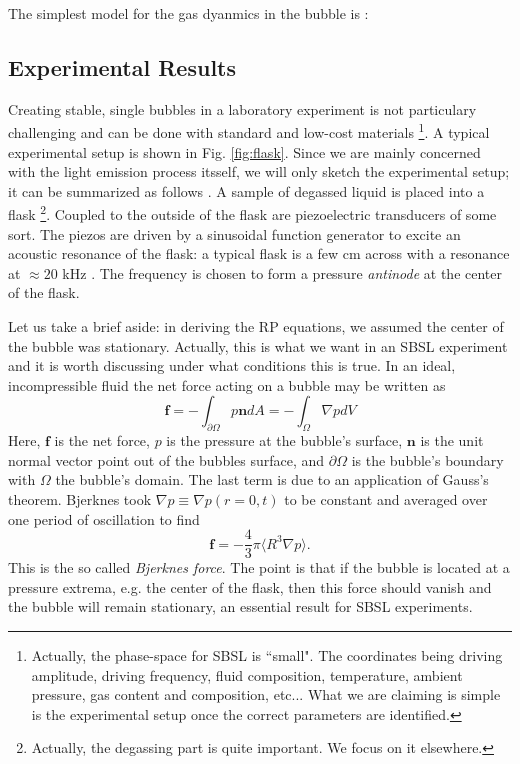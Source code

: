 \documentclass[rmp,aps,nofootinbib,superscriptaddress,floatfix,10pt]{revtex4-2}
\begin{document}
The simplest model for the gas dyanmics in the bubble is {}:



\subsection{Experimental Results}
Creating stable, single bubbles in a laboratory experiment is not particulary challenging and can be done with standard and low-cost materials \footnote{Actually, the phase-space for SBSL is ``small". The coordinates being driving amplitude, driving frequency, fluid composition, temperature, ambient pressure, gas content and composition, etc... What we are claiming is simple is the experimental setup once the correct parameters are identified.}. A typical experimental setup is shown in Fig. \ref{fig:flask}. Since we are mainly concerned with the light emission process itsself, we will only sketch the experimental setup; it can be summarized as follows \cite{lentz1995mie,gaitan1990experimental,gaitan1992sonoluminescence,gompf2000mie,brenner2002single,yasui2018acoustic,brennen2014cavitation,suslick2008inside}. A sample of degassed liquid is placed into a flask \footnote{Actually, the degassing part is quite important. We focus on it elsewhere.}. Coupled to the outside of the flask are piezoelectric transducers of some sort. The piezos are driven by a sinusoidal function generator to excite an acoustic resonance of the flask: a typical flask is a few cm across with a resonance at $\approx 20$ kHz \cite{brenner2002single}. The frequency is chosen to form a pressure \emph{antinode} at the center of the flask.

Let us take a brief aside: in deriving the RP equations, we assumed the center of the bubble was stationary. Actually, this is what we want in an SBSL experiment and it is worth discussing under what conditions this is true. In an ideal, incompressible fluid the net force acting on a bubble may be written as 
\begin{equation}
    \bm{f}=-\int_{\partial \Omega} p \bm{n} dA = -\int_\Omega \nabla p dV
\end{equation}
Here, $\bm{f}$ is the net force, $p$ is the pressure at the bubble's surface, $\bm{n}$ is the unit normal vector point out of the bubbles surface, and $\partial \Omega$ is the bubble's boundary with $\Omega$ the bubble's domain. The last term is due to an application of Gauss's theorem. Bjerknes \cite{bjerknes1909kraftfelder} took $\nabla p \equiv \nabla p(r=0,t)$ to be constant and averaged over one period of oscillation to find 
\begin{equation}
    \bm{f} = -\frac{4}{3}\pi \langle R^3 \nabla p \rangle.
    \label{eq:Bj_force}
\end{equation}
This is the so called \emph{Bjerknes force}. The point is that if the bubble is located at a pressure extrema, e.g. the center of the flask, then this force should vanish and the bubble will remain stationary, an essential result for SBSL experiments.
\end{document}
